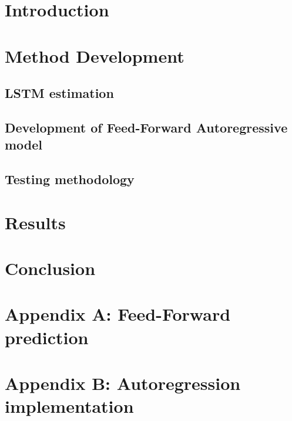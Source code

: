 \documentclass[journal]{IEEEtranTIE}
\begin{document}

\section{Introduction} \label{sec:Introduction}

\section{Method Development} \label{sec:layer}
\subsection{LSTM estimation}

\subsection{Development of Feed-Forward Autoregressive model} \label{sec:feed}

\subsection{Testing methodology}

\section{Results} \label{sec:results}
% 
\section{Conclusion} \label{sec:conclussion}





%
%
{
\clearpage
\appendices
\section{Appendix A: Feed-Forward prediction}  \label{app:Feed-Forward}

\clearpage
\section{Appendix B: Autoregression implementation}  \label{app:AutoFeedback}

}
{}
\end{document}
